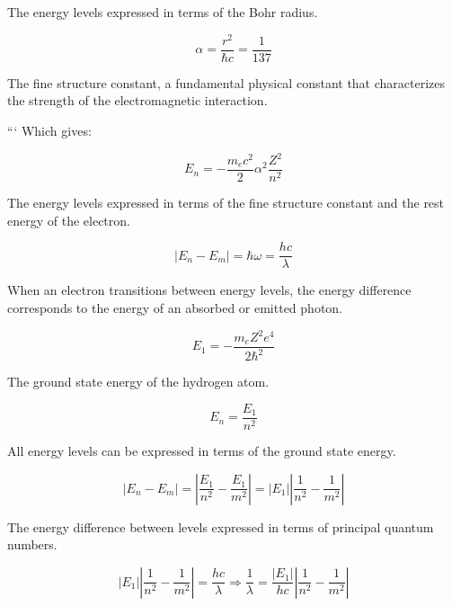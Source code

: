 \documentclass[italian]{HKNdocument}
\begin{document}
The energy levels expressed in terms of the Bohr radius.

\begin{equation*}
\alpha=\frac{r^{2}}{\hbar c}=\frac{1}{137} \tag{9.87}
\end{equation*}

The fine structure constant, a fundamental physical constant that characterizes the strength of the electromagnetic interaction.

```
Which gives:

\begin{equation*}
E_{n}=-\frac{m_{e} c^{2}}{2} \alpha^{2} \frac{Z^{2}}{n^{2}} \tag{9.88}
\end{equation*}

The energy levels expressed in terms of the fine structure constant and the rest energy of the electron.

\begin{equation*}
\left|E_{n}-E_{m}\right|=\hbar \omega=\frac{h c}{\lambda} \tag{9.89}
\end{equation*}

When an electron transitions between energy levels, the energy difference corresponds to the energy of an absorbed or emitted photon.

\begin{equation*}
E_{1}=-\frac{m_{e} Z^{2} e^{4}}{2 \hbar^{2}} \tag{9.90}
\end{equation*}

The ground state energy of the hydrogen atom.

\begin{equation*}
E_{n}=\frac{E_{1}}{n^{2}} \tag{9.91}
\end{equation*}

All energy levels can be expressed in terms of the ground state energy.

\begin{equation*}
\left|E_{n}-E_{m}\right|=\left|\frac{E_{1}}{n^{2}}-\frac{E_{1}}{m^{2}}\right|=\left|E_{1}\right|\left|\frac{1}{n^{2}}-\frac{1}{m^{2}}\right| \tag{9.92}
\end{equation*}

The energy difference between levels expressed in terms of principal quantum numbers.

\begin{equation*}
\left|E_{1}\right|\left|\frac{1}{n^{2}}-\frac{1}{m^{2}}\right|=\frac{h c}{\lambda} \Longrightarrow \frac{1}{\lambda}=\frac{\left|E_{1}\right|}{h c}\left|\frac{1}{n^{2}}-\frac{1}{m^{2}}\right| \tag{9.93}
\end{equation*}
\end{document}
